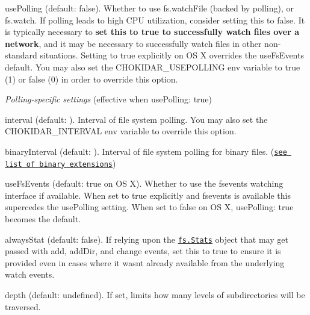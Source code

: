 \begin{DoxyItemize}
\item {\ttfamily use\+Polling} (default\+: {\ttfamily false}). Whether to use fs.\+watch\+File (backed by polling), or fs.\+watch. If polling leads to high C\+PU utilization, consider setting this to {\ttfamily false}. It is typically necessary to {\bfseries set this to {\ttfamily true} to successfully watch files over a network}, and it may be necessary to successfully watch files in other non-\/standard situations. Setting to {\ttfamily true} explicitly on OS X overrides the {\ttfamily use\+Fs\+Events} default. You may also set the C\+H\+O\+K\+I\+D\+A\+R\+\_\+\+U\+S\+E\+P\+O\+L\+L\+I\+NG env variable to true (1) or false (0) in order to override this option.
\item {\itshape Polling-\/specific settings} (effective when {\ttfamily use\+Polling\+: true})
\begin{DoxyItemize}
\item {\ttfamily interval} (default\+: {}). Interval of file system polling. You may also set the C\+H\+O\+K\+I\+D\+A\+R\+\_\+\+I\+N\+T\+E\+R\+V\+AL env variable to override this option.
\item {\ttfamily binary\+Interval} (default\+: {}). Interval of file system polling for binary files. (\href{https://github.com/sindresorhus/binary-extensions/blob/master/binary-extensions.json}{\tt see list of binary extensions})
\end{DoxyItemize}
\item {\ttfamily use\+Fs\+Events} (default\+: {\ttfamily true} on OS X). Whether to use the {\ttfamily fsevents} watching interface if available. When set to {\ttfamily true} explicitly and {\ttfamily fsevents} is available this supercedes the {\ttfamily use\+Polling} setting. When set to {\ttfamily false} on OS X, {\ttfamily use\+Polling\+: true} becomes the default.
\item {\ttfamily always\+Stat} (default\+: {\ttfamily false}). If relying upon the \href{http://nodejs.org/api/fs.html#fs_class_fs_stats}{\tt {\ttfamily fs.\+Stats}} object that may get passed with {\ttfamily add}, {\ttfamily add\+Dir}, and {\ttfamily change} events, set this to {\ttfamily true} to ensure it is provided even in cases where it wasn\textquotesingle{}t already available from the underlying watch events.
\item {\ttfamily depth} (default\+: {\ttfamily undefined}). If set, limits how many levels of subdirectories will be traversed.

\end{DoxyItemize}
